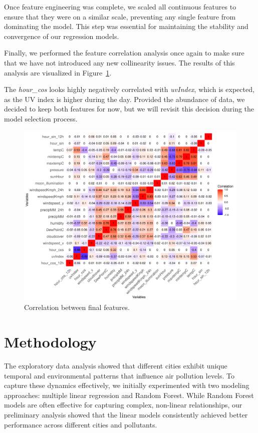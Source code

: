 \documentclass[twoside,11pt]{article}
\begin{document}
Once feature engineering was complete, we scaled all continuous features to ensure that they were on a similar scale, preventing any single feature from dominating the model. This step was essential for maintaining the stability and convergence of our regression models.

Finally, we performed the feature correlation analysis once again to make sure that we have not introduced any new collinearity issues. The results of this analysis are visualized in Figure~\ref{fig:final_feature_correlation}.

The \textit{hour\_cos} looks highly negatively correlated with \textit{uvIndex}, which is expected, as the UV index is higher during the day. Provided the abundance of data, we decided to keep both features for now, but we will revisit this decision during the model selection process.

\begin{figure}[H]
  \centering
  \includegraphics[width=\textwidth]{assets/feature-correlation-matrix-final.png}
  \caption{Correlation between final features.}
  \label{fig:final_feature_correlation}
\end{figure}

\section{Methodology}

The exploratory data analysis showed that different cities exhibit unique temporal and environmental patterns that influence air pollution levels. To capture these dynamics effectively, we initially experimented with two modeling approaches: multiple linear regression and Random Forest. While Random Forest models are often effective for capturing complex, non-linear relationships, our preliminary analysis showed that the linear models consistently achieved better performance across different cities and pollutants.
\end{document}
